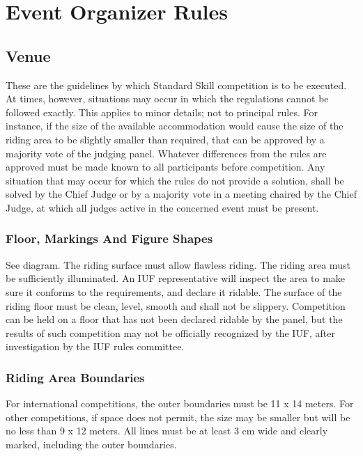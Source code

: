 \chapter{Event Organizer Rules}

\section{Venue}

These are the guidelines by which Standard Skill competition is to be executed.
At times, however, situations may occur in which the regulations cannot be followed exactly.
This applies to minor details; not to principal rules.
For instance, if the size of the available accommodation would cause the size of the riding area to be slightly smaller than required, that can be approved by a majority vote of the judging panel.
Whatever differences from the rules are approved must be made known to all participants before competition.
Any situation that may occur for which the rules do not provide a solution, shall be solved by the Chief Judge or by a majority vote in a meeting chaired by the Chief Judge, at which all judges active in the concerned event must be present.

\subsection{Floor, Markings And Figure Shapes}
See diagram.
The riding surface must allow flawless riding.
The riding area must be sufficiently illuminated.
An IUF representative will inspect the area to make sure it conforms to the requirements, and declare it ridable.
The surface of the riding floor must be clean, level, smooth and shall not be slippery.
Competition can be held on a floor that has not been declared ridable by the panel, but the results of such competition may not be officially recognized by the IUF, after investigation by the IUF rules committee.

\subsection{Riding Area Boundaries \label{subsec:freestyle_floor-markings-figure-shapes_riding-area-boundaries}}
For international competitions, the outer boundaries must be 11 x 14 meters.
For other competitions, if space does not permit, the size may be smaller but will be no less than 9 x 12 meters.
All lines must be at least 3 cm wide and clearly marked, including the outer boundaries.

